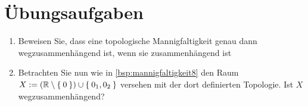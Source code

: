 \clearpage
\section*{Übungsaufgaben}

\begin{aufgabe}[Zusammenhang]\label{ub4:aufg1}
    \begin{enumerate}[label=(\alph*)]
        \item Beweisen Sie, dass eine topologische Mannigfaltigkeit
              genau dann wegzusammenhängend ist, wenn sie zusammenhängend
              ist
        \item Betrachten Sie nun wie in \cref{bsp:mannigfaltigkeit8}
              den Raum $X:= (\mathbb{R} \setminus \Set{0}) \cup \Set{0_1, 0_2}$
              versehen mit der dort definierten Topologie. Ist $X$
              wegzusammenhängend?
    \end{enumerate}
\end{aufgabe}
